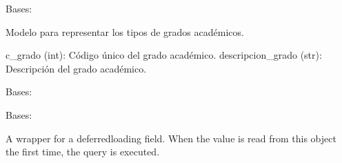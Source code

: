 \documentclass[letterpaper,10pt,spanish]{sphinxmanual}
\begin{document}
\begin{fulllineitems}

\pysigstartsignatures
{}
\pysigstopsignatures
\sphinxAtStartPar
Bases: 

\sphinxAtStartPar
Modelo para representar los tipos de grados académicos.
\begin{description}
\sphinxAtStartPar
c\_grado (int): Código único del grado académico.
descripcion\_grado (str): Descripción del grado académico.

\end{description}


\begin{fulllineitems}

\pysigstartsignatures
{}
\pysigstopsignatures
\sphinxAtStartPar
Bases: 

\end{fulllineitems}



\begin{fulllineitems}

\pysigstartsignatures
{}
\pysigstopsignatures
\sphinxAtStartPar
Bases: 

\end{fulllineitems}



\begin{fulllineitems}

\pysigstartsignatures
{}
\pysigstopsignatures
\sphinxAtStartPar
A wrapper for a deferred\sphinxhyphen{}loading field. When the value is read from this
object the first time, the query is executed.

\end{fulllineitems}



\begin{fulllineitems}


\end{fulllineitems}
\end{fulllineitems}
\end{document}
